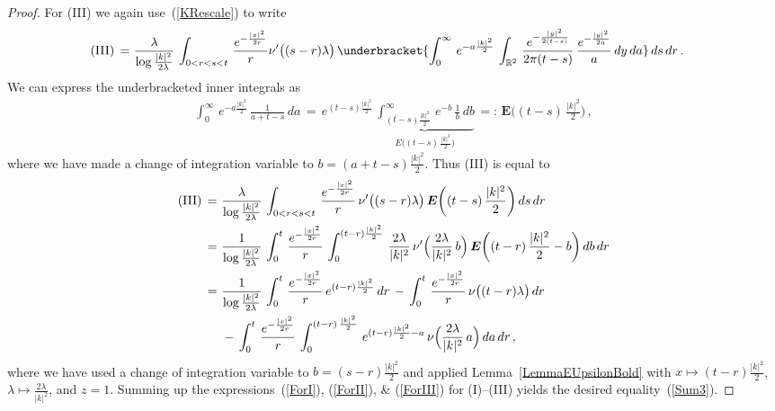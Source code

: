\documentclass[10pt]{article}
\numberwithin{equation}{section}
\theoremstyle{definition}
\newcommand{\R}{{\mathbb R}}
\begin{document}
\begin{appendix}
\begin{proof}
For (III)  we again use~(\ref{KRescale}) to write
\begin{align*}
\textup{(III)}\,=\, &\,\frac{  \lambda }{\log \frac{|k|^2}{2\lambda}   }\, \int_{0 < r < s  < t}\,\frac{ e^{-\frac{|x|^2  }{2r }  }  }{ r }\nu'\big((s-r)\lambda\big)\, \underbracket{\int_0^{\infty}\,e^{-a\frac{|k|^2}{2}  } \,\int_{\R^2}\,\frac{ e^{-\frac{|y|^2  }{2(t-s) }  }  }{2\pi (t-s) }\, \frac{e^{-\frac{ |y|^2  }{ 2a } }  }{ a } \, dy \, da}\,ds\,dr \,.
\end{align*}
We can express the underbracketed inner integrals as
\begin{align*}
  \int_0^{\infty}\,e^{-a\frac{|k|^2}{2}  }\,\frac{ 1 }{a+t-s  } \, da \,=\,  e^{(t-s) \frac{|k|^2}{2} }\,\underbrace{\int_{(t-s)\frac{|k|^2}{2}}^{\infty}\,e^{-b  }\,\frac{ 1 }{b }  \,db}_{E\big((t-s)\,\frac{|k|^2}{2}\big) }\,=:\,\boldsymbol{E}\bigg( (t-s)\,\frac{|k|^2}{2}   \bigg)\,,
\end{align*}
where we have made a change of integration variable to $b=(a+t-s)\frac{|k|^2}{2}$. Thus  (III) is equal to
\begin{align} \label{ForIII}
\textup{(III)}
\,=\, &\,\frac{  \lambda }{\log \frac{|k|^2}{2\lambda}   } \,\int_{0 < r < s  < t}\,\frac{ e^{-\frac{|x|^2  }{2r }  }  }{ r }  \,\nu'\big((s-r)\lambda\big) \,\boldsymbol{E}\bigg( (t-s) \, \frac{|k|^2}{2}\bigg)  \,  ds\, dr  \nonumber \\
\,=\, &\,\frac{ 1 }{\log \frac{|k|^2}{2\lambda}   } \,\int_{0}^t\,\frac{ e^{-\frac{|x|^2  }{2r }  }  }{ r } \,\int_0^{(t-r)\frac{|k|^2}{2} } \, \frac{2\lambda}{|k|^2}\,\nu'\Big(\frac{2\lambda}{|k|^2}\, b\Big) \,\boldsymbol{E}\bigg( (t-r)\,\frac{|k|^2}{2} -b  \bigg)   \,   db\, dr  \nonumber 
 \\
\,=\, &\,\frac{ 1 }{\log \frac{|k|^2}{2\lambda}   } \,\int_{0}^t\,\frac{ e^{-\frac{|x|^2  }{2r }  }  }{ r } \,e^{(t-r)\frac{|k|^2}{2} }\, dr\,-\, \int_{0}^t\,\frac{ e^{-\frac{|x|^2  }{2r }  }  }{ r }\,\nu\big( (t-r)  \lambda \big)\, dr  \nonumber  \\ & \,-\, \int_{0}^t\,\frac{ e^{-\frac{|x|^2  }{2r }  }  }{ r }\,\int_0^{(t-r)\, \frac{|k|^2}{2}  }\,e^{ (t-r)\frac{|k|^2}{2} -a }\,\nu\Big( \frac{2\lambda}{|k|^2} \, a\Big)\, da\,  dr \,, 
\end{align}
where we have used a change of integration variable to $b=(s-r) \frac{|k|^2}{2} $ and applied Lemma~\ref{LemmaEUpsilonBold} with $ x\mapsto (t-r)\frac{|k|^2}{2}   $, $ \lambda \mapsto \frac{2\lambda}{|k|^2}   $,  and $z=1$.  Summing up the expressions~(\ref{ForI}), (\ref{ForII}), \& (\ref{ForIII}) for (I)--(III) yields the desired equality~(\ref{Sum3}). \vspace{.2cm}



\end{proof}
\end{appendix}
\end{document}
